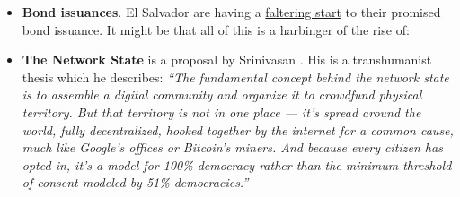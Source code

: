 \begin{itemize}
\begin{itemize}
\item \textbf{Bond issuances}. El Salvador are having a \href{https://www.ft.com/content/4fa63c8c-51f5-4512-b522-76dd75e62916}{faltering start} to their promised bond issuance. It might be that all of this is a harbinger of the rise of: 
\item \textbf{The Network State} is a proposal by Srinivasan \cite{Srinivasan2022}. His is a transhumanist thesis which he describes: \textit{``The fundamental concept behind the network state is to assemble a digital community and organize it to crowdfund physical territory. But that territory is not in one place — it’s spread around the world, fully decentralized, hooked together by the internet for a common cause, much like Google’s offices or Bitcoin’s miners. And because every citizen has opted in, it’s a model for 100\% democracy rather than the minimum threshold of consent modeled by 51\% democracies.''}
\end{itemize}

\end{itemize}
